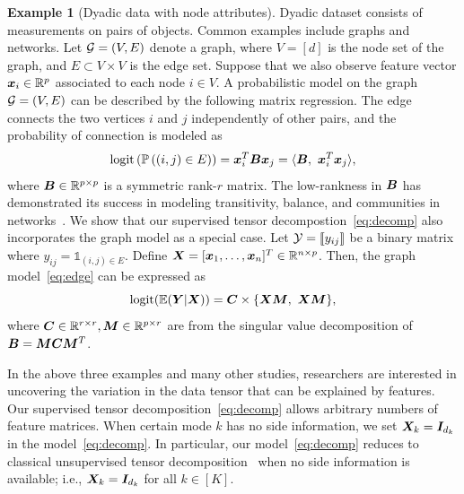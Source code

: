 \documentclass[12pt]{article}
\theoremstyle{definition}
\theoremstyle{definition}
\newtheorem{example}{Example}
\begin{document}
 \begin{example}[Dyadic data with node attributes] Dyadic dataset consists of measurements on pairs of objects. Common examples include graphs and networks. Let $\mathcal{G}=(V,E)$ denote a graph, where $V=[d]$ is the node set of the graph, and $E\subset V\times V$ is the edge set. Suppose that we also observe feature vector $\bm x_i\in\mathbb{R}^p$ associated to each node $i\in V$. A probabilistic model on the graph $\mathcal{G}=(V,E)$ can be described by the following matrix regression. The edge connects the two vertices $i$ and $j$ independently of other pairs, and the probability of connection is modeled as
\begin{equation}\label{eq:edge}
 \textup{logit}\left(\mathbb{P}\left((i,j)\in E\right)\right)=\mx^T_i\mB\mx_j=\langle \mB,\ \mx^T_i\mx_j\rangle,
 \end{equation}
 where $\bm B\in\mathbb{R}^{p\times p}$ is a symmetric rank-$r$ matrix. The low-rankness in $\bm B$ has demonstrated its success in modeling transitivity, balance, and communities in  networks~\citep{hoff2005bilinear}. We show that our supervised tensor decompostion~\eqref{eq:decomp} also incorporates the graph model as a special case. Let $\mathcal{Y}=\llbracket y_{ij} \rrbracket$ be a binary matrix where $y_{ij}=\mathds{1}_{(i,j)\in E}$. Define $\bm X=[\bm x_1,\ldots,\bm x_n]^T\in\mathbb{R}^{n\times p}$. Then, the graph model~\eqref{eq:edge} can be expressed as
 \[
 \textup{logit}(\mathbb{E}(\mY|\mX))=\mC\times\{\mX\mM,\ \mX\mM\}, 
  \]
  where $\bm C\in\mathbb{R}^{r\times r}, \bm M\in\mathbb{R}^{p\times r}$ are from the singular value decomposition of $\bm B=\bm M\bm C\bm M^T$. 
  \end{example}




In the above three examples and many other studies, researchers are interested in uncovering the variation in the data tensor that can be explained by features. Our supervised tensor decomposition~\eqref{eq:decomp} allows arbitrary numbers of feature matrices. When certain mode $k$ has no side information, we set $\bm X_k=\bm I_{d_k}$ in the model~\eqref{eq:decomp}. In particular, our model~\eqref{eq:decomp} reduces to classical unsupervised tensor decomposition~\citep{de2000multilinear,hong2020generalized} when no side information is available; i.e., $\bm X_k=\bm I_{d_k}$ for all $k\in[K]$.
\end{document}
